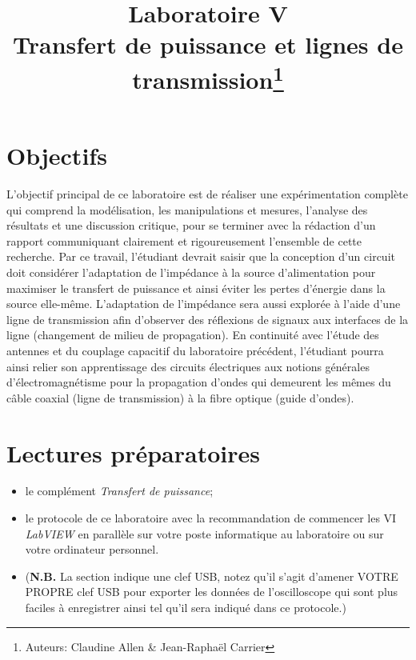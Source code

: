 \documentclass[canadien,12pt,oneside,letterpaper]{article}
\title{\textbf{Laboratoire V}\\Transfert de puissance et lignes de transmission\thanks{Auteurs: Claudine Allen \& Jean-Raphaël Carrier}}
\date{}
\begin{document}
\maketitle \vspace{-2cm}

\section{Objectifs}

L’objectif principal de ce laboratoire est de réaliser une expérimentation complète qui comprend la modélisation, les manipulations et mesures, l’analyse des résultats et une discussion critique, pour se terminer avec la rédaction d’un rapport communiquant clairement et rigoureusement l’ensemble de cette recherche. Par ce travail, l’étudiant devrait saisir que la conception d’un circuit doit considérer l’adaptation de l’impédance à la source d’alimentation pour maximiser le transfert de puissance et ainsi éviter les pertes d’énergie dans la source elle-même. L’adaptation de l’impédance sera aussi explorée à l’aide d’une ligne de transmission afin d’observer des réflexions de signaux aux interfaces de la ligne (changement de milieu de propagation). En continuité avec l’étude des antennes et du couplage capacitif du laboratoire précédent, l’étudiant pourra ainsi relier son apprentissage des circuits électriques aux notions générales d’électromagnétisme pour la propagation d’ondes qui demeurent les mêmes du câble coaxial (ligne de transmission) à la fibre optique (guide d’ondes).

\section[Lectures préparatoires]{Lectures préparatoires} \label{sec:prep}

\begin{itemize} \itemsep4pt
\item le complément \textit{Transfert de puissance};
\item le protocole de ce laboratoire avec la recommandation de commencer les VI \textit{LabVIEW} en parallèle sur votre poste informatique au laboratoire ou sur votre ordinateur personnel.
\item (\textbf{N.B.} La section  indique une clef USB, notez qu'il s'agit d'amener VOTRE PROPRE clef USB pour exporter les données de l'oscilloscope qui sont plus faciles à enregistrer ainsi tel qu'il sera indiqué dans ce protocole.)
\end{itemize}
\end{document}
